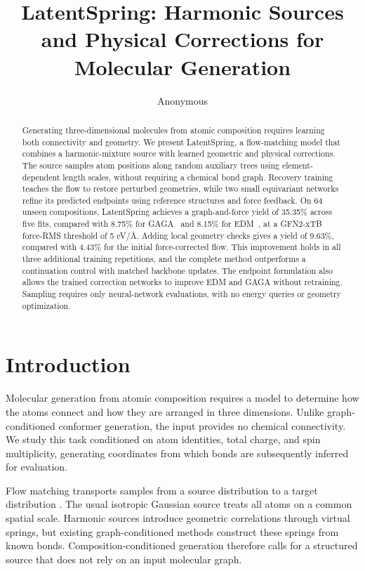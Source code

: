\documentclass{article}
\title{LatentSpring: Harmonic Sources and Physical Corrections for Molecular Generation}
\author{Anonymous}
\begin{document}
\maketitle
\begin{abstract}
Generating three-dimensional molecules from atomic composition requires learning both connectivity and geometry. We present LatentSpring, a flow-matching model that combines a harmonic-mixture source with learned geometric and physical corrections. The source samples atom positions along random auxiliary trees using element-dependent length scales, without requiring a chemical bond graph. Recovery training teaches the flow to restore perturbed geometries, while two small equivariant networks refine its predicted endpoints using reference structures and force feedback. On 64 unseen compositions, LatentSpring achieves a graph-and-force yield of 35.35\% across five fits, compared with 8.75\% for GAGA~\citep{qu2026gaga} and 8.15\% for EDM~\citep{edm}, at a GFN2-xTB force-RMS threshold of 5 eV/\AA. Adding local geometry checks gives a yield of 9.63\%, compared with 4.43\% for the initial force-corrected flow. This improvement holds in all three additional training repetitions, and the complete method outperforms a continuation control with matched backbone updates. The endpoint formulation also allows the trained correction networks to improve EDM and GAGA without retraining. Sampling requires only neural-network evaluations, with no energy queries or geometry optimization.
\end{abstract}

\section{Introduction}
Molecular generation from atomic composition requires a model to determine how the atoms connect and how they are arranged in three dimensions. Unlike graph-conditioned conformer generation, the input provides no chemical connectivity. We study this task conditioned on atom identities, total charge, and spin multiplicity, generating coordinates from which bonds are subsequently inferred for evaluation.

Flow matching transports samples from a source distribution to a target distribution \citep{lipman2023flowmatching}. The usual isotropic Gaussian source treats all atoms on a common spatial scale. Harmonic sources introduce geometric correlations through virtual springs, but existing graph-conditioned methods construct these springs from known bonds. Composition-conditioned generation therefore calls for a structured source that does not rely on an input molecular graph.
\end{document}
